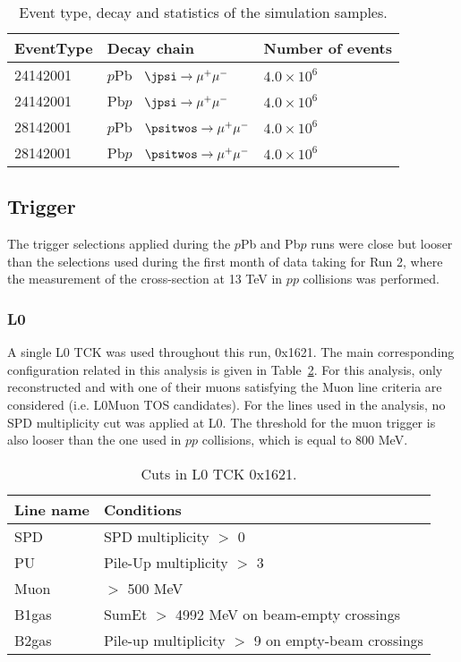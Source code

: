 \begin{table}[!tbp]
\caption{Event type, decay and statistics of the simulation samples.}
\begin{center}
\begin{tabular}{lll}
\hline
\textbf{EventType} & \textbf{Decay chain} & \textbf{Number of events} \\
\hline
24142001 & $p$Pb \ $\jpsi\rightarrow \mu^+ \mu^-$ & $4.0\times 10^6$ \\
24142001 & Pb$p$ \ $\jpsi\rightarrow \mu^+ \mu^-$ & $4.0\times 10^6$  \\
28142001 & $p$Pb \ $\psitwos\rightarrow \mu^+ \mu^-$ & $4.0\times 10^6$  \\
28142001 & Pb$p$ \ $\psitwos\rightarrow \mu^+ \mu^-$ & $4.0\times 10^6$  \\
\hline
\end{tabular}
\end{center}
\label{MC}
\end{table}

\subsection{Trigger}
The trigger selections applied during the $p$Pb and Pb$p$ runs were close but looser than the selections used during the first month of data taking for Run 2, where the measurement of the \jpsi cross-section at 13 TeV in $pp$ collisions was performed.
\subsubsection{L0}
A single L0 TCK was used throughout this run, 0x1621. The main corresponding configuration related in this analysis is given in Table~\ref{L0TCK}. For this analysis, only reconstructed \jpsi and \psitwos with one of their muons satisfying the Muon line criteria are considered (i.e. L0Muon TOS candidates). For the lines used in the analysis, no SPD multiplicity cut was applied at L0. The threshold for the muon trigger is also looser than the one used in $pp$ collisions, which is equal to 800 MeV.
\begin{table}[H]
\caption{Cuts in L0 TCK 0x1621.}
\begin{center}
\begin{tabular}{ll}
\hline
\textbf{Line name} & \textbf{Conditions}\\
\hline
	SPD & SPD multiplicity $>$ 0\\
	PU & Pile-Up multiplicity $>$ 3\\
	Muon & \pt $>$ 500 MeV\\
	B1gas & SumEt $>$ 4992 MeV on beam-empty crossings \\
	B2gas & Pile-up multiplicity $>$ 9 on empty-beam crossings\\
\hline
\end{tabular}
\end{center}
\label{L0TCK}
\end{table}

